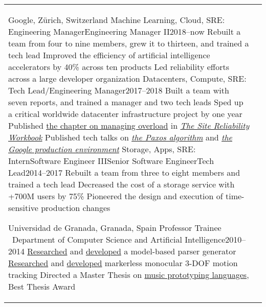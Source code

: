 \documentclass[letterpaper,10pt,oneside]{article}
\newcommand{\DatestampY}[1]{#1}
\newenvironment{body}
{\par\par
\begin{longtable}{p{0.142\textwidth}p{0.807\textwidth}}}
{\par\end{longtable}\par}
\newcommand{\SmallEntryGap}{\par\vspace{0.1em}\par}
\begin{document}
\begin{body}
Google, Z\"urich, Switzerland\newline
\phantom{w}Machine Learning, Cloud, SRE: Engineering Manager\textrightarrow Engineering Manager II\hfill \DatestampY{2018}--now\setlength{\dimen0}{\widthof{now}}\hspace{-\dimen0}\hphantom{\DatestampY{2000}} \newline
\phantom{ww}Rebuilt a team from four to nine members, grew it to thirteen, and trained a tech lead\newline
\phantom{ww}Improved the efficiency of artificial intelligence accelerators by 40\% across ten products\newline
\phantom{ww}Led reliability efforts across a large developer organization\newline
\phantom{w}Datacenters, Compute, SRE: Tech Lead/Engineering Manager\hfill \DatestampY{2017}--\DatestampY{2018} \newline
\phantom{ww}Built a team with seven reports, and trained a manager and two tech leads\newline
\phantom{ww}Sped up a critical worldwide datacenter infrastructure project by one year\newline
\phantom{ww}Published \href{https://landing.google.com/sre/workbook/chapters/overload/}{the chapter on managing overload} in \textit{\href{https://landing.google.com/sre/books/}{The Site Reliability Workbook}}\newline
\phantom{ww}Published tech talks on \textit{\href{https://youtu.be/d7nAGI_NZPk}{the Paxos algorithm}} and \textit{\href{https://youtu.be/dhTVVWzpc4Q}{the Google production environment}}\newline
\phantom{w}Storage, Apps, SRE: Intern\textrightarrow Software Engineer III\textrightarrow Senior Software Engineer\textrightarrow Tech Lead\hfill \DatestampY{2014}--\DatestampY{2017} \newline
\phantom{ww}Rebuilt a team from three to eight members and trained a tech lead\newline
\phantom{ww}Decreased the cost of a storage service with +700M users by 75\%\newline
\phantom{ww}Pioneered the design and execution of time-sensitive production changes

\SmallEntryGap

Universidad de Granada, Granada, Spain\newline
\phantom{w}Professor Trainee \textendash\ Department of Computer Science and Artificial Intelligence\hfill \DatestampY{2010}--\DatestampY{2014} \newline
\phantom{ww}\href{https://doi.org/10.1142/S0218194014500375}{Researched} and \href{https://github.com/lquesada/ModelCC}{developed} a model-based parser generator \newline
\phantom{ww}\href{https://doi.org/10.1142/S0129065712500190}{Researched} and \href{https://github.com/lquesada/MotionTracking}{developed} markerless monocular 3-DOF motion tracking \newline
\phantom{ww}Directed a Master Thesis on \href{https://github.com/lquesada/ADAgio}{music prototyping languages}, Best Thesis Award


\end{body}
\end{document}
